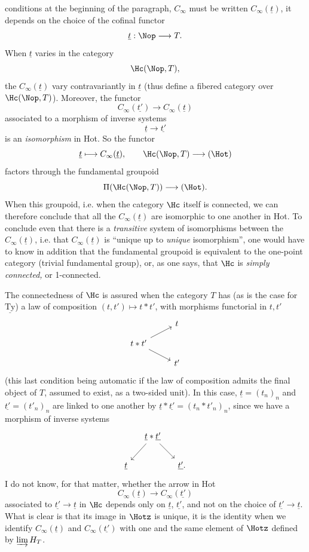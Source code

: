 conditions at the beginning of the paragraph, $C_\infty$ must be written $C_\infty(\underline{t})$, it depends on the choice of the cofinal functor
\[
\underline{t} : \Nop \longrightarrow T.
\]
When $\underline{t}$ varies in the category
\[
\Hc(\Nop, T),
\]
the $C_\infty(\underline{t})$ vary contravariantly in $\underline{t}$ (thus define a fibered category over $\Hc(\Nop, T)$). Moreover, the functor
\[
C_\infty(\underline{t'}) \longrightarrow C_\infty(\underline{t})
\]
associated to a morphism of inverse systems
\[
\underline{t} \longrightarrow \underline{t'}
\]
is an \textit{isomorphism} in Hot. So the
functor
\[
\underline{t} \longmapsto C_\infty(\underline{t}), \qquad \Hc(\Nop, T) \longrightarrow (\Hot)
\]
factors through the fundamental groupoid
\[
\Pi(\Hc(\Nop, T)) \longrightarrow (\Hot).
\]
When this groupoid, i.e. when the category $\Hc$ itself is connected, we can therefore conclude that all the $C_\infty(\underline{t})$ are isomorphic to one another in Hot. To conclude even that there is a \textit{transitive} system of isomorphisms between the $C_\infty(\underline{t})$, i.e. that $C_\infty(\underline{t})$ is ``unique up to \textit{unique} isomorphism'', one would have to know in addition that the fundamental groupoid is equivalent to the one-point category (trivial fundamental group), or, as one says, that $\Hc$ is \textit{simply connected,} or 1-connected.

The connectedness of $\Hc$ is assured when the category $T$ has (as is the case for $\underline{\mathrm{Ty}}$) a law of composition $(t,t') \longmapsto t * t'$, with morphisms functorial in $t, t'$
\[
\begin{tikzcd}[row sep=small]
 & t \\
t * t' \arrow[ru] \arrow[rd] & \\
 & t'
\end{tikzcd}
\]
(this last condition being automatic
if the law of composition admits the final object of $T$, assumed to exist, as a two-sided unit). In this case, $\underline{t} = (t_n)_n$ and $\underline{t'} = (t'_n)_n$ are linked to one another by $\underline{t} * \underline{t'} = (t_n * t'_n)_n$, since we have a morphism of inverse systems
\[
\begin{tikzcd}[column sep=small]
 & \underline{t} * \underline{t'} \arrow[ld] \arrow[rd] & \\
\underline{t} & & \underline{t'}.
\end{tikzcd}
\]
I do not know, for that matter, whether the arrow in Hot
\[
C_\infty(\underline{t}) \longrightarrow C_\infty(\underline{t'})
\]
associated to $\underline{t'} \longrightarrow \underline{t}$ in $\Hc$ depends only on $\underline{t}$, $\underline{t'}$, and not on the choice of $\underline{t'} \longrightarrow \underline{t}$. What is clear is that its image in $\Hotz$ is unique, it is the identity when we identify $C_\infty(\underline{t})$ and $C_\infty(\underline{t'})$ with one and the same element of $\Hotz$ defined by $\varinjlim H_T$.

